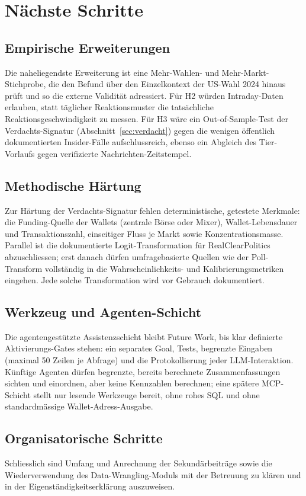 \chapter{Nächste Schritte}
\label{ch:naechste}

\section{Empirische Erweiterungen}
Die naheliegendste Erweiterung ist eine Mehr-Wahlen- und Mehr-Markt-Stichprobe, die
den Befund über den Einzelkontext der US-Wahl 2024 hinaus prüft und so die externe
Validität adressiert. Für H2 würden Intraday-Daten erlauben, statt täglicher
Reaktionsmuster die tatsächliche Reaktionsgeschwindigkeit zu messen. Für H3 wäre ein
Out-of-Sample-Test der Verdachts-Signatur (Abschnitt~\ref{sec:verdacht}) gegen die
wenigen öffentlich dokumentierten Insider-Fälle aufschlussreich, ebenso ein Abgleich
des Tier-Vorlaufs gegen verifizierte Nachrichten-Zeitstempel.

\section{Methodische Härtung}
Zur Härtung der Verdachts-Signatur fehlen deterministische, getestete Merkmale: die
Funding-Quelle der Wallets (zentrale Börse oder Mixer), Wallet-Lebensdauer und
Transaktionszahl, einseitiger Fluss je Markt sowie Konzentrationsmasse. Parallel ist
die dokumentierte Logit-Transformation für RealClearPolitics abzuschliessen; erst
danach dürfen umfragebasierte Quellen wie der Poll-Transform vollständig in die
Wahrscheinlichkeits- und Kalibrierungsmetriken eingehen. Jede solche Transformation
wird vor Gebrauch dokumentiert.

\section{Werkzeug und Agenten-Schicht}
Die agentengestützte Assistenzschicht bleibt Future Work, bis klar definierte
Aktivierungs-Gates stehen: ein separates Goal, Tests, begrenzte Eingaben (maximal
50 Zeilen je Abfrage) und die Protokollierung jeder LLM-Interaktion. Künftige
Agenten dürfen begrenzte, bereits berechnete Zusammenfassungen sichten und einordnen,
aber keine Kennzahlen berechnen; eine spätere MCP-Schicht stellt nur lesende
Werkzeuge bereit, ohne rohes SQL und ohne standardmässige Wallet-Adress-Ausgabe.

\section{Organisatorische Schritte}
Schliesslich sind Umfang und Anrechnung der Sekundärbeiträge sowie die
Wiederverwendung des Data-Wrangling-Moduls mit der Betreuung zu klären und in der
Eigenständigkeitserklärung auszuweisen.
